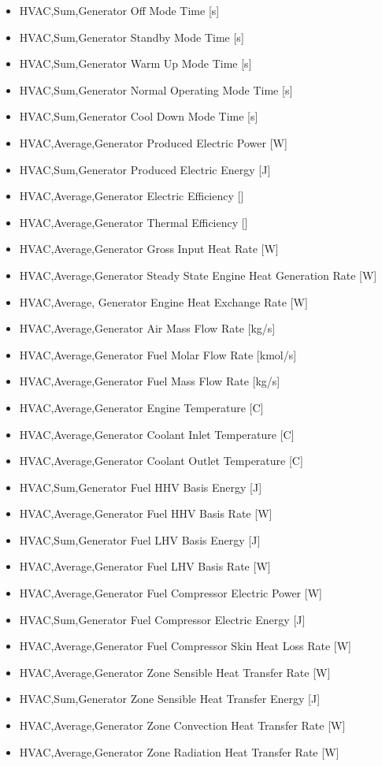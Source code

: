 \begin{itemize}
\item
  HVAC,Sum,Generator Off Mode Time {[}s{]}
\item
  HVAC,Sum,Generator Standby Mode Time {[}s{]}
\item
  HVAC,Sum,Generator Warm Up Mode Time {[}s{]}
\item
  HVAC,Sum,Generator Normal Operating Mode Time {[}s{]}
\item
  HVAC,Sum,Generator Cool Down Mode Time {[}s{]}
\item
  HVAC,Average,Generator Produced Electric Power {[}W{]}
\item
  HVAC,Sum,Generator Produced Electric Energy {[}J{]}
\item
  HVAC,Average,Generator Electric Efficiency {[]}
\item
  HVAC,Average,Generator Thermal Efficiency {[]}
\item
  HVAC,Average,Generator Gross Input Heat Rate {[}W{]}
\item
  HVAC,Average,Generator Steady State Engine Heat Generation Rate {[}W{]}
\item
  HVAC,Average, Generator Engine Heat Exchange Rate {[}W{]}
\item
  HVAC,Average,Generator Air Mass Flow Rate {[}kg/s{]}
\item
  HVAC,Average,Generator Fuel Molar Flow Rate {[}kmol/s{]}
\item
  HVAC,Average,Generator Fuel Mass Flow Rate {[}kg/s{]}
\item
  HVAC,Average,Generator Engine Temperature {[}C{]}
\item
  HVAC,Average,Generator Coolant Inlet Temperature {[}C{]}
\item
  HVAC,Average,Generator Coolant Outlet Temperature {[}C{]}
\item
  HVAC,Sum,Generator Fuel HHV Basis Energy {[}J{]}
\item
  HVAC,Average,Generator Fuel HHV Basis Rate {[}W{]}
\item
  HVAC,Sum,Generator Fuel LHV Basis Energy {[}J{]}
\item
  HVAC,Average,Generator Fuel LHV Basis Rate {[}W{]}
\item
  HVAC,Average,Generator Fuel Compressor Electric Power {[}W{]}
\item
  HVAC,Sum,Generator Fuel Compressor Electric Energy {[}J{]}
\item
  HVAC,Average,Generator Fuel Compressor Skin Heat Loss Rate {[}W{]}
\item
  HVAC,Average,Generator Zone Sensible Heat Transfer Rate {[}W{]}
\item
  HVAC,Sum,Generator Zone Sensible Heat Transfer Energy {[}J{]}
\item
  HVAC,Average,Generator Zone Convection Heat Transfer Rate {[}W{]}
\item
  HVAC,Average,Generator Zone Radiation Heat Transfer Rate {[}W{]}
\end{itemize}

